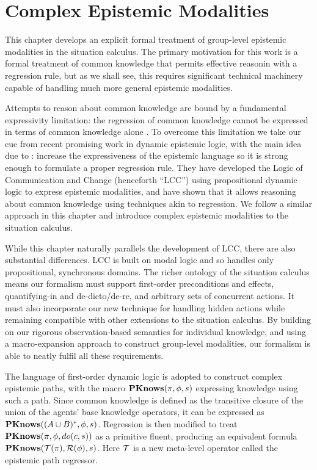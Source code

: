 

\chapter{Complex Epistemic Modalities}

\label{ch:cknowledge}

This chapter develops an explicit formal treatment of group-level
epistemic modalities in the situation calculus. The primary motivation
for this work is a formal treatment of common knowledge that permits
effective reasonin with a regression rule, but as we shall see, this
requires significant technical machinery capable of handling much
more general epistemic modalities.

Attempts to reason about common knowledge are bound by a fundamental
expressivity limitation: the regression of common knowledge cannot
be expressed in terms of common knowledge alone \citep{baltag98pa_ck}.
To overcome this limitation we take our cue from recent promising
work in dynamic epistemic logic, with the main idea due to \citet{vanBenthem06lcc}:
increase the expressiveness of the epistemic language so it is strong
enough to formulate a proper regression rule. They have developed
the Logic of Communication and Change (henceforth {}``LCC'') using
propositional dynamic logic to express epistemic modalities, and have
shown that it allows reasoning about common knowledge using techniques
akin to regression. We follow a similar approach in this chapter and
introduce complex epistemic modalities to the situation calculus.

While this chapter naturally parallels the development of LCC, there
are also substantial differences. LCC is built on modal logic and
so handles only propositional, synchronous domains. The richer ontology
of the situation calculus means our formalism must support first-order
preconditions and effects, quantifying-in and de-dicto/de-re, and
arbitrary sets of concurrent actions. It must also incorporate our
new technique for handling hidden actions while remaining compatible
with other extensions to the situation calculus. By building on our
rigorous observation-based semantics for individual knowledge, and
using a macro-expansion approach to construct group-level modalities,
our formalism is able to neatly fulfil all these requirements.

The language of first-order dynamic logic is adopted to construct
complex epistemic paths, with the macro $\mathbf{PKnows}(\pi,\phi,s)$ expressing
knowledge using such a path. Since common knowledge is defined as
the transitive closure of the union of the agents' base knowledge
operators, it can be expressed as $\mathbf{PKnows}((A\cup B)^{*},\phi,s)$.
Regression is then modified to treat $\mathbf{PKnows}(\pi,\phi,do(c,s))$
as a primitive fluent, producing an equivalent formula $\mathbf{PKnows}(\mathcal{T}(\pi),\mathcal{R}(\phi),s)$.
Here $\mathcal{T}$ is a new meta-level operator called the epistemic path
regressor.

